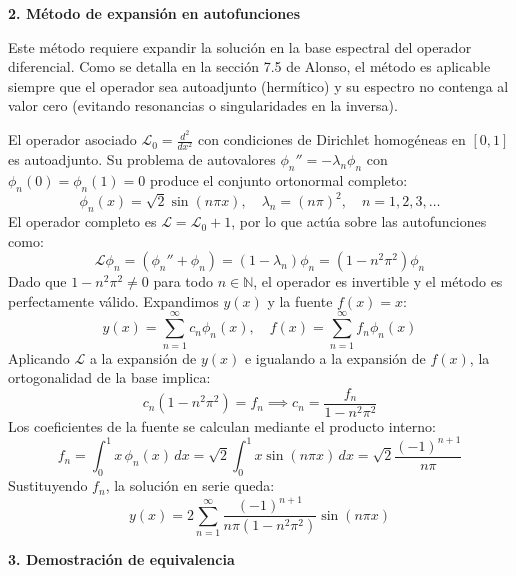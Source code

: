 \documentclass[a4paper]{article}
\begin{document}
\textbf{2. Método de expansión en autofunciones}

Este método requiere expandir la solución en la base espectral del operador diferencial. Como se detalla en la sección 7.5 de Alonso, el método es aplicable siempre que el operador sea autoadjunto (hermítico) y su espectro no contenga al valor cero (evitando resonancias o singularidades en la inversa). 

El operador asociado $\mathscr{L}_0 = \frac{d^2}{dx^2}$ con condiciones de Dirichlet homogéneas en $[0, 1]$ es autoadjunto. Su problema de autovalores $\phi_n'' = -\lambda_n \phi_n$ con $\phi_n(0)=\phi_n(1)=0$ produce el conjunto ortonormal completo:
$$ \phi_n(x) = \sqrt{2} \sin(n\pi x), \quad \lambda_n = (n\pi)^2, \quad n = 1, 2, 3, \dots $$
El operador completo es $\mathscr{L} = \mathscr{L}_0 + 1$, por lo que actúa sobre las autofunciones como:
$$ \mathscr{L}\phi_n = (\phi_n'' + \phi_n) = (1 - \lambda_n)\phi_n = (1 - n^2\pi^2)\phi_n $$
Dado que $1 - n^2\pi^2 \neq 0$ para todo $n \in \mathbb{N}$, el operador es invertible y el método es perfectamente válido. Expandimos $y(x)$ y la fuente $f(x)=x$:
$$ y(x) = \sum_{n=1}^\infty c_n \phi_n(x), \quad f(x) = \sum_{n=1}^\infty f_n \phi_n(x) $$
Aplicando $\mathscr{L}$ a la expansión de $y(x)$ e igualando a la expansión de $f(x)$, la ortogonalidad de la base implica:
$$ c_n (1 - n^2\pi^2) = f_n \implies c_n = \frac{f_n}{1 - n^2\pi^2} $$
Los coeficientes de la fuente se calculan mediante el producto interno:
$$ f_n = \int_0^1 x \, \phi_n(x) \, dx = \sqrt{2} \int_0^1 x \sin(n\pi x) \, dx = \sqrt{2} \frac{(-1)^{n+1}}{n\pi} $$
Sustituyendo $f_n$, la solución en serie queda:
$$ y(x) = 2 \sum_{n=1}^\infty \frac{(-1)^{n+1}}{n\pi (1 - n^2\pi^2)} \sin(n\pi x) $$

\textbf{3. Demostración de equivalencia}
\end{document}
